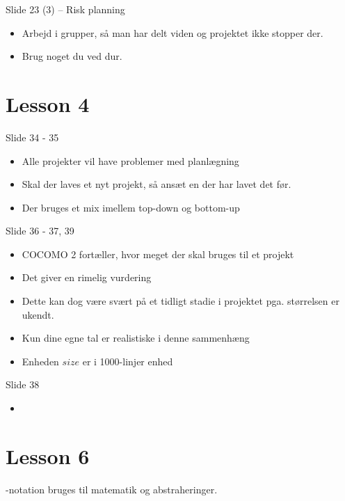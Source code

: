 \documentclass[a4, 10pt]{article}
\begin{document}
Slide 23 (3) -- Risk planning
\begin{itemize}
	\item Arbejd i grupper, så man har delt viden og projektet ikke stopper der.
	\item Brug noget du ved dur.
\end{itemize}






\newpage
\section*{Lesson 4}

Slide 34 - 35
 \begin{itemize}
 	\item Alle projekter vil have problemer med planlægning
 	\item Skal der laves et nyt projekt, så ansæt en der har lavet det før.
 	\item Der bruges et mix imellem top-down og bottom-up
 \end{itemize}
 Slide 36 - 37, 39
 \begin{itemize}
 	\item COCOMO 2 fortæller, hvor meget der skal bruges til et projekt
 	\item Det giver en rimelig vurdering
 	\item Dette kan dog være svært på et tidligt stadie i projektet pga. størrelsen er ukendt.
 	\item Kun dine egne tal er realistiske i denne sammenhæng
 	\item Enheden $size$ er i 1000-linjer enhed
 \end{itemize}
 Slide 38
 \begin{itemize}
 	\item 
 \end{itemize}




\newpage
\section*{Lesson 6}
-notation bruges til matematik og abstraheringer.
\end{document}
